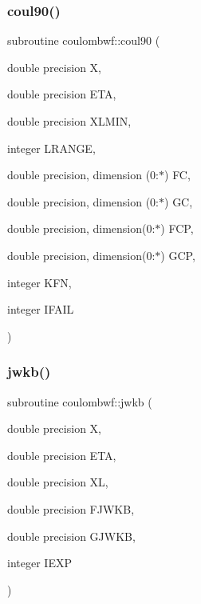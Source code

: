 \subsubsection{\texorpdfstring{coul90()}{coul90()}}
{\footnotesize\ttfamily subroutine coulombwf\+::coul90 (\begin{DoxyParamCaption}\item[{double precision}]{X,  }\item[{double precision}]{E\+TA,  }\item[{double precision}]{X\+L\+M\+IN,  }\item[{integer}]{L\+R\+A\+N\+GE,  }\item[{double precision, dimension (0\+:$\ast$)}]{FC,  }\item[{double precision, dimension (0\+:$\ast$)}]{GC,  }\item[{double precision, dimension(0\+:$\ast$)}]{F\+CP,  }\item[{double precision, dimension(0\+:$\ast$)}]{G\+CP,  }\item[{integer}]{K\+FN,  }\item[{integer}]{I\+F\+A\+IL }\end{DoxyParamCaption})}

\mbox{\label{namespacecoulombwf_ae2567eabc2798a95c720b07a68e61bba}} 
\subsubsection{\texorpdfstring{jwkb()}{jwkb()}}
{\footnotesize\ttfamily subroutine coulombwf\+::jwkb (\begin{DoxyParamCaption}\item[{double precision}]{X,  }\item[{double precision}]{E\+TA,  }\item[{double precision}]{XL,  }\item[{double precision}]{F\+J\+W\+KB,  }\item[{double precision}]{G\+J\+W\+KB,  }\item[{integer}]{I\+E\+XP }\end{DoxyParamCaption})}

